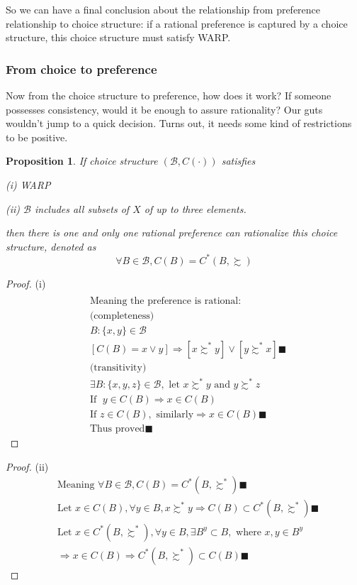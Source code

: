 \documentclass{article}
\newtheorem{proposition}{Proposition}
\begin{document}
So we can have a final conclusion about the relationship from preference relationship to choice structure: if a rational preference is captured by a choice structure, this choice structure must satisfy WARP.

\subsubsection{From choice to preference}
Now from the choice structure to preference, how does it work? If someone possesses consistency, would it be enough to assure rationality? Our guts wouldn't jump to a quick decision. Turns out, it needs some kind of restrictions to be positive.

\begin{proposition}
If choice structure $(\mathscr{B},C(\cdot))$ satisfies

(i) 
WARP

(ii) 
$\mathscr{B}$ includes all subsets of $X$ of up to three elements.

then there is one and only one rational preference can rationalize this choice structure, denoted as
$$\forall B\in \mathscr{B},C(B)=C^{*}(B,\succsim)$$
\end{proposition}

\begin{proof}
(i)
\begin{align}
\\& \text{Meaning the preference is rational: }
\\&\text{(completeness)}
\\&B:\{x,y\}\in \mathscr{B}
\\&[C(B)=x\lor y] \Rightarrow [x\succsim^{*} y] \lor [y\succsim^{*} x]\blacksquare
\\&\text{(transitivity)}
\\&\exists B:\{x,y,z\}\in \mathscr{B}, \text{ let } x \succsim^{*} y \text{ and }  y\succsim^{*} z
\\&\text{If } \; y\in C(B) \Rightarrow x \in C(B)
\\&\text{If } z\in C(B), \text{ similarly} \Rightarrow x\in C(B) 
\blacksquare
\\& \text{Thus proved}\blacksquare
\end{align}
\end{proof}

\begin{proof}
(ii)
\begin{align}
&\text{Meaning }\forall B \in \mathscr{B}, C(B)=C^{*}(B,\succsim^{*})\blacksquare
\\& \text{Let } x \in C(B),\forall y\in B,x\succsim^{*}y \Rightarrow C(B)\subset C^{*}(B,\succsim^{*})
\blacksquare
\\& \text{Let }x\in C^{*}(B,\succsim^{*}),\forall y\in B, \exists B^{y}\subset B, \text{ where } x,y\in B^{y} 
\\&\Rightarrow x\in C(B) \Rightarrow C^{*}(B,\succsim^{*})\subset C(B)\blacksquare
\end{align}
\end{proof}
\end{document}
